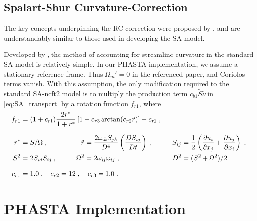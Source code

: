 \documentclass[11pt]{article}
\begin{document}
\subsection{Spalart-Shur Curvature-Correction}

The key concepts underpinning the RC-correction were proposed by \citet{spalart1997}, and are understandably similar to those used in developing the SA model.

Developed by \citet{shur2000}, the method of accounting for streamline curvature in the standard SA model is relatively simple. In our PHASTA implementation, we assume a stationary reference frame. Thus $\Omega_m' = 0$ in the referenced paper, and Coriolos terms vanish. With this assumption, the only modification required to the standard SA-noft2 model is to multiply the production term $c_{b1} \tilde{S} \tilde{\nu}$ in \eqref{eq:SA_transport} by a rotation function $f_{r1}$, where
\begin{align}
	&\begin{aligned}
		\mathllap{f_{r1}} = (1 + c_{r1}) \frac{2 r^*}{1 + r^*} \left[ 1 - c_{r3} \arctan(c_{r2} \tilde{r}) \right] - c_{r1}
		\;,
		\label{eq:SARC_rotation_function}
	\end{aligned}\\[0.25cm]
	\phantom{f_{r1}}
	&\begin{aligned}
		\mathllap{r^*} &= S / \Omega
		\;, &\qquad
		\tilde{r} &= \frac{2 \omega_{ik} S_{jk}}{D^4} \left( \frac{D S_{ij}}{D t} \right)
		\;, &\qquad
		S_{ij} &= \frac{1}{2} \left( \pp{u_i}{x_j} + \pp{u_j}{x_i} \right)
		\;, \\
		\mathllap{S^2} &= 2 S_{ij} S_{ij}
		\;, &\qquad
		\Omega^2 &= 2 \omega_{ij} \omega_{ij}
		\;, &\qquad
		D^2 &= (S^2 + \Omega^2) / 2
		\label{eq:SARC_definitions}
	\end{aligned}\\[0.25cm]
	&\begin{aligned}
		\mathllap{c_{r1}} &= 1.0
		\;, \quad
		c_{r2} = 12
		\;, \quad
		c_{r3} = 1.0
		\;.
		\label{eq:SARC_constants}
	\end{aligned}
\end{align}

\section{PHASTA Implementation} %
\end{document}
